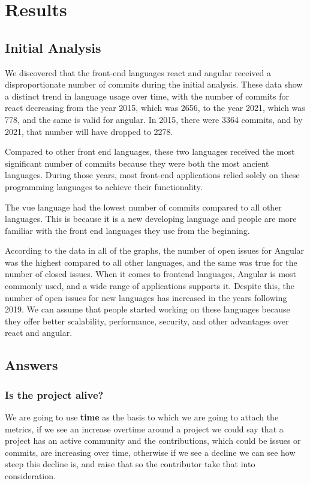 \section{Results}
\subsection{Initial Analysis}
We discovered that the front-end languages react and angular received a disproportionate number of commits during the initial analysis. These data show a distinct trend in language usage over time, with the number of commits for react decreasing from the year 2015, which was 2656, to the year 2021, which was 778, and the same is valid for angular.
In 2015, there were 3364 commits, and by 2021, that number will have dropped to 2278.

Compared to other front end languages, these two languages received the most significant number of commits because they were both the most ancient languages. During those years, most front-end applications relied solely on these programming languages to achieve their functionality.

The vue language had the lowest number of commits compared to all other languages. This is because it is a new developing language and people are more familiar with the front end languages they use from the beginning.

According to the data in all of the graphs, the number of open issues for Angular was the highest compared to all other languages, and the same was true for the number of closed issues. When it comes to frontend languages, Angular is most commonly used, and a wide range of applications supports it. Despite this, the number of open issues for new languages has increased in the years following 2019. We can assume that people started working on these languages because they offer better scalability, performance, security, and other advantages over react and angular.

\subsection{Answers}
\subsubsection{Is the project alive?}
We are going to use \textbf{time} as the basis to which we are going to attach the metrics, if we see an increase overtime around a project we could say that a project has an active community and the contributions, which could be issues or commits, are increasing over time, otherwise if we see a decline we can see how steep this decline is, and raise that so the contributor take that into consideration.

